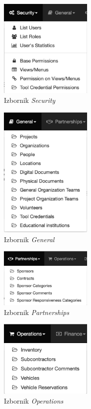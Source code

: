 \documentclass[times, utf8, diplomski]{fer}
\begin{document}
\begin{figure}[H]
    \centering
    \includegraphics[width=0.4\textwidth]{slike/m0.png}
    \caption{Izbornik \emph{Security}}
\end{figure}
\begin{figure}[H]
    \centering
    \includegraphics[width=0.4\textwidth]{slike/m1.png}
    \caption{Izbornik \emph{General}}
\end{figure}
\begin{figure}[H]
    \centering
    \includegraphics[width=0.4\textwidth]{slike/m2.png}
    \caption{Izbornik \emph{Partnerships}}
\end{figure}
\begin{figure}[H]
    \centering
    \includegraphics[width=0.4\textwidth]{slike/m3.png}
    \caption{Izbornik \emph{Operations}}
\end{figure}
\end{document}
